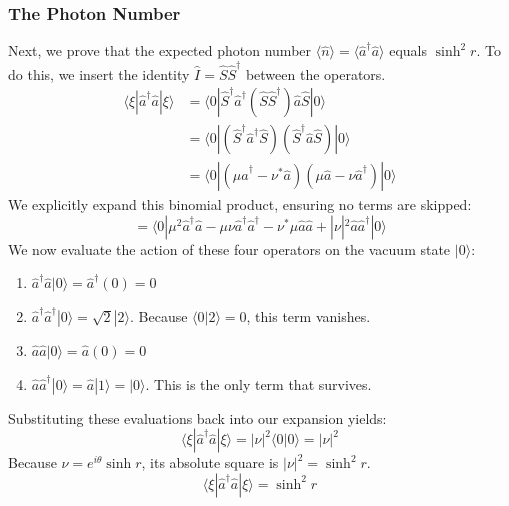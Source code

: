 \subsubsection{The Photon Number}
Next, we prove that the expected photon number $\langle\hat{n}\rangle = \langle \hat{a}^\dagger \hat{a} \rangle$ equals $\sinh^2 r$. To do this, we insert the identity $\hat{I} = \hat{S}\hat{S}^\dagger$ between the operators.
\begin{align*}
\langle \xi | \hat{a}^\dagger\hat{a} | \xi \rangle &= \langle 0 | \hat{S}^\dagger \hat{a}^\dagger (\hat{S}\hat{S}^\dagger) \hat{a} \hat{S} | 0 \rangle \\
&= \langle 0 | (\hat{S}^\dagger \hat{a}^\dagger \hat{S}) (\hat{S}^\dagger \hat{a} \hat{S}) | 0 \rangle \\
&= \langle 0 | (\mu\hat{a}^\dagger - \nu^*\hat{a})(\mu\hat{a} - \nu\hat{a}^\dagger) | 0 \rangle
\end{align*}
We explicitly expand this binomial product, ensuring no terms are skipped:
\begin{equation*}
= \langle 0 | \mu^2 \hat{a}^\dagger\hat{a} - \mu\nu \hat{a}^\dagger\hat{a}^\dagger - \nu^*\mu \hat{a}\hat{a} + |\nu|^2 \hat{a}\hat{a}^\dagger | 0 \rangle
\end{equation*}
We now evaluate the action of these four operators on the vacuum state $|0\rangle$:
\begin{enumerate}
    \item $\hat{a}^\dagger\hat{a} | 0 \rangle = \hat{a}^\dagger (0) = 0$
    \item $\hat{a}^\dagger\hat{a}^\dagger | 0 \rangle = \sqrt{2} | 2 \rangle$. Because $\langle 0 | 2 \rangle = 0$, this term vanishes.
    \item $\hat{a}\hat{a} | 0 \rangle = \hat{a} (0) = 0$
    \item $\hat{a}\hat{a}^\dagger | 0 \rangle = \hat{a} | 1 \rangle = | 0 \rangle$. This is the only term that survives.
\end{enumerate}
Substituting these evaluations back into our expansion yields:
\begin{equation*}
\langle \xi | \hat{a}^\dagger\hat{a} | \xi \rangle = |\nu|^2 \langle 0 | 0 \rangle = |\nu|^2
\end{equation*}
Because $\nu = e^{i\theta}\sinh r$, its absolute square is $|\nu|^2 = \sinh^2 r$.
\begin{equation}
\langle \xi | \hat{a}^\dagger\hat{a} | \xi \rangle = \sinh^2 r
\end{equation}

